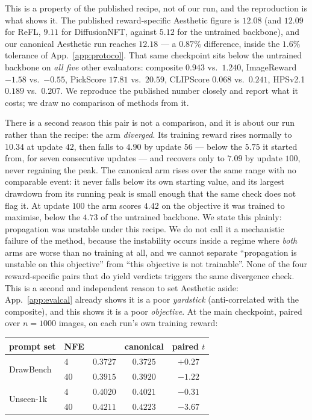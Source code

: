 This is a property of the published recipe, not of our run, and the reproduction is what shows
it. The published reward-specific Aesthetic figure is $12.08$ (and $12.09$ for ReFL, $9.11$ for
DiffusionNFT, against $5.12$ for the untrained backbone), and our canonical Aesthetic run
reaches $12.18$ --- a $0.87\%$ difference, inside the $1.6\%$ tolerance of
App.~\ref{app:protocol}. That same checkpoint sits below the untrained backbone on
\emph{all five} other evaluators: composite $0.943$ vs.\ $1.240$, ImageReward $-1.58$ vs.\
$-0.55$, PickScore $17.81$ vs.\ $20.59$, CLIPScore $0.068$ vs.\ $0.241$, HPSv2.1 $0.189$ vs.\
$0.207$. We reproduce the published number closely and report what it costs; we draw no
comparison of methods from it.

There is a second reason this pair is not a comparison, and it is about our run rather than the
recipe: the \MSP arm \emph{diverged}. Its training reward rises normally to $10.34$ at update
$42$, then falls to $4.90$ by update $56$ --- below the $5.75$ it started from, for seven
consecutive updates --- and recovers only to $7.09$ by update $100$, never regaining the peak.
The canonical arm rises over the same range with no comparable event: it never falls below
its own starting value, and its largest drawdown from its running peak is small enough that the
same check does not flag it. At update $100$ the \MSP arm scores
$4.42$ on the objective it was trained to maximise, below the $4.73$ of the untrained backbone.
We state this plainly: propagation was unstable under this recipe. We do not call it a
mechanistic failure of the method, because the instability occurs inside a regime where
\emph{both} arms are worse than no training at all, and we cannot separate ``propagation is
unstable on this objective'' from ``this objective is not trainable''. None of the four
reward-specific pairs that do yield verdicts triggers the same divergence check. This is a second and
independent reason to set Aesthetic aside: App.~\ref{app:evalcal} already shows it is a poor
\emph{yardstick} (anti-correlated with the composite), and this shows it is a poor
\emph{objective}. At the main checkpoint, paired over
$n=1000$ images, on each run's own training reward:

\begin{center}
\begin{tabular}{llccc}
\toprule
prompt set & NFE & \MSP & canonical & paired $t$\\
\midrule
\multirow{2}{*}{DrawBench} & $4$  & $0.3727$ & $0.3725$ & $+0.27$\\
                           & $40$ & $0.3915$ & $0.3920$ & $-1.22$\\
\midrule
\multirow{2}{*}{Unseen-1k} & $4$  & $0.4020$ & $0.4021$ & $-0.31$\\
                           & $40$ & $0.4211$ & $0.4223$ & $-3.67$\\
\bottomrule
\end{tabular}
\end{center}

